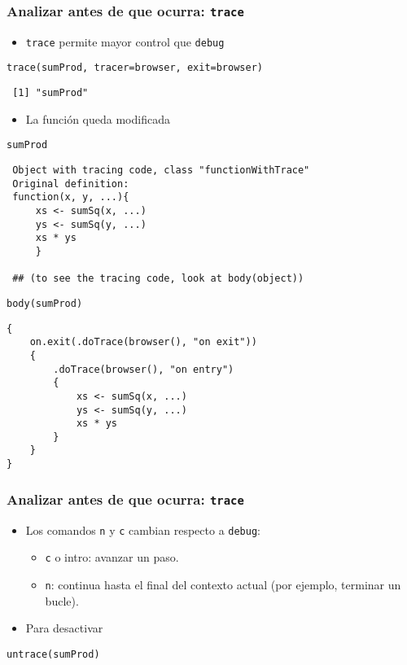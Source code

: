 \documentclass[xcolor={usenames,svgnames,dvipsnames}]{beamer}
\begin{document}
\begin{frame}[fragile]
\frametitle{Analizar antes de que ocurra: \texttt{trace}}
\label{sec-3-3}

\begin{itemize}
\item \texttt{trace} permite mayor control que \texttt{debug}
\end{itemize}

\lstset{language=R}
\begin{lstlisting}
trace(sumProd, tracer=browser, exit=browser)
\end{lstlisting}

\begin{verbatim}
 [1] "sumProd"
\end{verbatim}

\begin{itemize}
\item La función queda modificada
\end{itemize}

\lstset{language=R}
\begin{lstlisting}
sumProd
\end{lstlisting}

\begin{verbatim}
 Object with tracing code, class "functionWithTrace"
 Original definition: 
 function(x, y, ...){
     xs <- sumSq(x, ...)
     ys <- sumSq(y, ...)
     xs * ys
     }
 
 ## (to see the tracing code, look at body(object))
\end{verbatim}


\lstset{language=R}
\begin{lstlisting}
body(sumProd)
\end{lstlisting}


\begin{verbatim}
{
    on.exit(.doTrace(browser(), "on exit"))
    {
        .doTrace(browser(), "on entry")
        {
            xs <- sumSq(x, ...)
            ys <- sumSq(y, ...)
            xs * ys
        }
    }
}
\end{verbatim}
\end{frame}
\begin{frame}[fragile]
\frametitle{Analizar antes de que ocurra: \texttt{trace}}
\label{sec-3-4}

\begin{itemize}
\item Los comandos \texttt{n} y \texttt{c} cambian respecto a \texttt{debug}:
\begin{itemize}
\item \texttt{c} o intro: avanzar un paso.
\item \texttt{n}: continua hasta el final del contexto actual (por ejemplo,
    terminar un bucle).
\end{itemize}
\item Para desactivar
\end{itemize}

\lstset{language=R}
\begin{lstlisting}
untrace(sumProd)
\end{lstlisting}
\end{frame}
\end{document}
